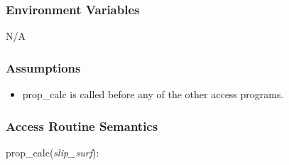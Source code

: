 \documentclass[12pt, titlepage]{article}
\begin{document}
\subsubsection{Environment Variables}
N/A

\subsubsection{Assumptions}
\begin{itemize}
	\item prop\_calc is called before any of the other access programs.
\end{itemize}

\subsubsection{Access Routine Semantics}
prop\_calc(\textit{slip\_surf}):
\end{document}
